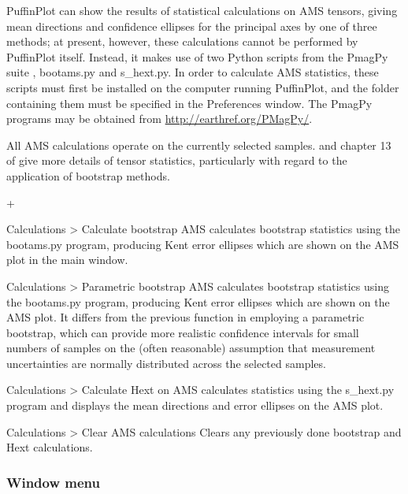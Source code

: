 \documentclass[a4paper,british]{article}
\newcommand{\menuitemlabel}[1]{%
\mbox{\textsf{#1}}\hfil}
\newenvironment{menuitemlist}%
{\begin{list}{}{%
\renewcommand{\makelabel}{\menuitemlabel}%
\setlength{\labelwidth}{35pt}%
\setlength{\leftmargin}%
             {\labelwidth+\labelsep}}}%
{\end{list}}
\newcommand{\ppcmd}[1]{\textsf{#1}} %
\newcommand{\caps}[1]{\MakeTextUppercase{#1}} %
\newcommand{\submenu}{ \textgreater{} } %
\begin{document}
PuffinPlot can show the results of statistical calculations on \caps{ams}
tensors, giving mean directions and confidence ellipses for the principal
axes by one of three methods; at present, however, these calculations cannot
be performed by PuffinPlot itself. Instead, it makes use of two Python
scripts from the PmagPy suite \citep{tauxe2010paleomagnetism},
\ppcmd{bootams.py} and \ppcmd{s\_hext.py}. In order to calculate \caps{ams}
statistics, these scripts must first be installed on the computer running
PuffinPlot, and the folder containing them must be specified in the
\ppcmd{Preferences} window. The PmagPy programs may be obtained from
\url{http://earthref.org/PMagPy/}.

All \caps{ams} calculations operate on the currently selected samples.
\cite{tauxe1998directions} and chapter 13 of \cite{tauxe2010paleomagnetism}
give more details of tensor statistics, particularly with regard to the
application of bootstrap methods.

\begin{menuitemlist}

\item[Calculations\submenu Calculate bootstrap \caps{ams}] calculates
bootstrap statistics using the \ppcmd{bootams.py} program, producing
Kent error ellipses which are shown on the \caps{ams} plot in the main
window.

\item[Calculations\submenu Parametric bootstrap \caps{ams}] calculates
bootstrap statistics using the \ppcmd{bootams.py} program, producing Kent
error ellipses which are shown on the \caps{ams} plot. It differs from the
previous function in employing a parametric bootstrap, which can provide more
realistic confidence intervals for small numbers of samples on the (often
reasonable) assumption that measurement uncertainties are normally
distributed across the selected samples.

\item[Calculations\submenu Calculate Hext on \caps{ams}] calculates
\cite{hext1963tensors} statistics using the \ppcmd{s\_hext.py} program
and displays the mean directions and error ellipses on the \caps{ams} plot.

\item[Calculations\submenu Clear \caps{ams} calculations] Clears
any previously done bootstrap and Hext calculations.

\end{menuitemlist}

\subsubsection{\label{sec:menu-window}Window menu}
\end{document}
